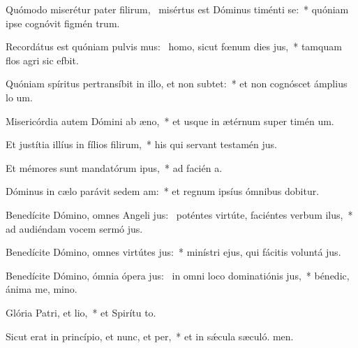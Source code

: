 \item Quómodo miserétur pater filirum,~\pscross{} misértus est Dóminus timénti se:~* quóniam ipse cognóvit figmén trum.
\item Recordátus est quóniam pulvis mus:~\pscross{} homo, sicut fœnum dies jus,~* tamquam flos agri sic efbit.
\item Quóniam spíritus pertransíbit in illo, et non subtet:~* et non cognóscet ámplius lo um.
\item Misericórdia autem Dómini ab æno,~* et usque in ætérnum super timén um.
\item Et justítia illíus in fílios filirum,~* his qui servant testamén jus.
\item Et mémores sunt mandatórum ipus,~* ad facién a.
\item Dóminus in cælo parávit sedem am:~* et regnum ipsíus ómnibus dobitur.
\item Benedícite Dómino, omnes Angeli jus:~\pscross{} poténtes virtúte, faciéntes verbum ilus,~* ad audiéndam vocem sermó jus.
\item Benedícite Dómino, omnes virtútes jus:~* minístri ejus, qui fácitis voluntá jus.
\item Benedícite Dómino, ómnia ópera jus:~\pscross{} in omni loco dominatiónis jus,~* bénedic, ánima me, mino.
\item Glória Patri, et lio,~* et Spirítu to.
\item Sicut erat in princípio, et nunc, et per,~* et in sǽcula sæculó. men.
